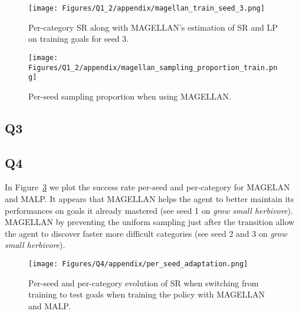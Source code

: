 \begin{figure}[!ht]
    \centering
    \texttt{[image: Figures/Q1\_2/appendix/magellan\_train\_seed\_3.png]}
    \caption{Per-category SR along with MAGELLAN's estimation of SR and LP on training goals for seed 3.}
    \label{fig:app_q1q2_magellan_seed3}
\end{figure}

\begin{figure}[!ht]
    \centering
    \texttt{[image: Figures/Q1\_2/appendix/magellan\_sampling\_proportion\_train.png]}
    \caption{Per-seed sampling proportion when using MAGELLAN.}
    \label{fig:app_q1q2_magellan_sampling}
\end{figure}


\subsection{\textbf{Q3}} \label{app:additional_results_q3}


\subsection{\textbf{Q4}} \label{app:additional_results_q4}

In Figure~\ref{fig:app_q4_sr} we plot the success rate per-seed and per-category for MAGELAN and MALP. It appears that MAGELLAN helps the agent to better maintain its performances on goals it already mastered (see seed 1 on \textit{grow small herbivore}). MAGELLAN by preventing the uniform sampling just after the transition allow the agent to discover faster more difficult categories (see seed 2 and 3 on \textit{grow small herbivore}).
\begin{figure}[!ht]
    \centering
    \texttt{[image: Figures/Q4/appendix/per\_seed\_adaptation.png]}
    \caption{Per-seed and per-category evolution of SR when switching from training to test goals when training the policy with MAGELLAN and MALP.}
    \label{fig:app_q4_sr}
\end{figure}